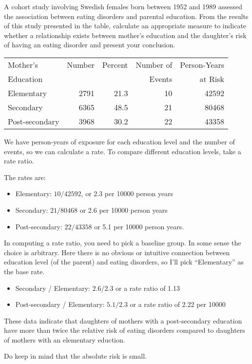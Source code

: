 
A cohort study involving Swedish females born between 1952 and 1989 assessed the association between eating disorders and parental education.  From the results of this study presented in the table, calculate an appropriate measure to indicate whether a relationship exists between mother's education and the daughter's risk of having an eating disorder and present your conclusion. 

\begin{center}
\begin{tabular}{lrrrr}
Mother's & Number & Percent & Number of & Person-Years\\
Education & & & Events & at Risk\\\hline
Elementary & 2791 & 21.3 & 10 & 42592\\
Secondary & 6365 & 48.5 & 21 & 80468\\
Post-secondary & 3968 & 30.2 & 22 & 43358\\
\end{tabular}
\end{center} 

\TextEntry

\begin{TextEntry}
We have person-years of exposure for each education level and the
number of events, so we can calculate a rate.  To compare different
education levels, take a rate ratio.

The rates are:
\begin{itemize}
\item Elementary: $10/42592$, or 2.3 per 10000 person years
\item Secondary: $21/80468$ or 2.6 per 10000 person years
\item Post-secondary: $22/43358$ or 5.1 per 10000 person years.
\end{itemize}

In computing a rate ratio, you need to pick a baseline group.  In some
sense the choice is arbitrary.  Here there is no obvious or intuitive
connection between education level (of the parent) and eating
disorders, so I'll pick ``Elementary'' as the base rate.

\begin{itemize}
\item Secondary / Elementary: $2.6/2.3$ or a rate ratio of 1.13
\item Post-secondary / Elementary: $5.1/2.3$ or a rate ratio of 2.22
  per 10000
\end{itemize}

These data indicate that daughters of mothers with a post-secondary
education have more than twice the relative risk of eating disorders
compared to daughters of mothers with an elementary eduction.

Do keep in mind that the absolute risk is small.

\end{TextEntry}
